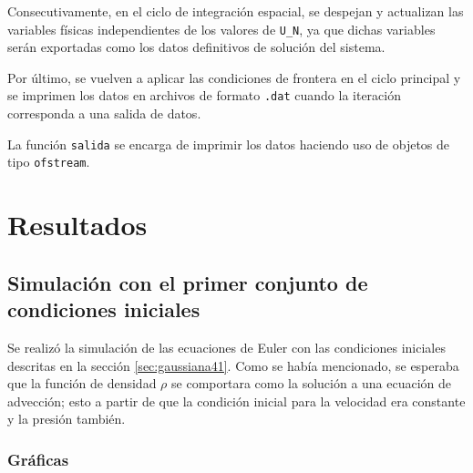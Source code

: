 Consecutivamente, en el ciclo de integración espacial, se despejan y actualizan las variables físicas independientes de los valores de \texttt{U\_N}, ya que dichas variables serán exportadas como los datos definitivos de solución del sistema.


Por último, se vuelven a aplicar las condiciones de frontera en el ciclo principal y se imprimen los datos en archivos de formato \texttt{.dat} cuando la iteración corresponda a una salida de datos.


La función \texttt{salida} se encarga de imprimir los datos haciendo uso de objetos de tipo \texttt{ofstream}.

\section{Resultados}
\subsection{Simulación con el primer conjunto de condiciones iniciales}
Se realizó la simulación de las ecuaciones de Euler con las condiciones iniciales descritas en la sección \ref{sec:gaussiana41}. Como se había mencionado, se esperaba que la función de densidad $\rho$ se comportara como la solución a una ecuación de advección; esto a partir de que la condición inicial para la velocidad era constante y la presión también.

\subsubsection{Gráficas}

